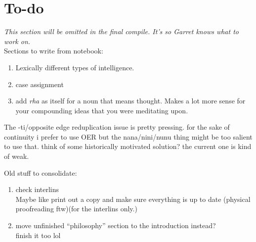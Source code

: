 \section*{To-do}

\emph{This section will be omitted in the final compile. It's so Garret knows what to work on.}\\

Sections to write from notebook:
	\begin{enumerate}
		\item Lexically different types of intelligence.
		\item case assignment
		\item add \emph{rha} as itself for a noun that means thought. Makes a lot more sense for your compounding ideas that you were meditating upon.
	\end{enumerate}

The -ti/opposite edge reduplication issue is pretty pressing. for the sake of continuity i prefer to use OER but the nana/nini/nunu thing might be too salient to use that. think of some historically motivated solution? the current one is kind of weak.

Old stuff to consolidate:
	\begin{enumerate}
		\item check interlins
		\\ Maybe like print out a copy and make sure everything is up to date (physical proofreading ftw)(for the interlins only.)
		\item move unfinished ``philosophy'' section to the introduction instead?
			\\ finish it too lol
	\end{enumerate}

